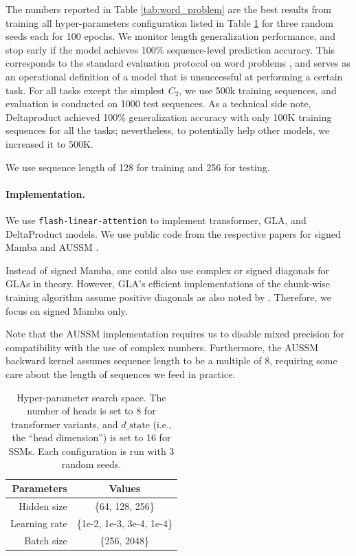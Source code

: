 The numbers reported in Table \ref{tab:word_problem} are the best results from
training all hyper-parameters configuration listed in Table \ref{tab:hyperparameters}
for three random seeds each for 100 epochs.
We monitor length generalization performance, and stop early
if the model achieves 100\% sequence-level prediction accuracy.
This corresponds to the standard evaluation protocol on word problems \citep{merrill2024illusion,siems2025deltaproduct}, and serves as an operational definition of a model that is unsuccessful at performing a certain task.
For all tasks except the simplest $C_2$, we use 500k training sequences, and evaluation is conducted on 1000 test sequences. 
As a technical side note, Deltaproduct achieved 100\% generalization accuracy with only 100K training sequences for all the tasks; nevertheless, to potentially help other models, we increased it to 500K.

We use sequence length of 128 for training and 256 for testing.

\paragraph{Implementation.}
We use \texttt{flash-linear-attention} \citep{yang2024fla} to implement transformer, GLA, and DeltaProduct models.
We use public code from the respective papers for signed Mamba \citep{grazzi2024unlocking} and AUSSM \citep{karuvally2025bridging}.

Instead of signed Mamba, one could also use complex or signed diagonals for GLAs in theory.
However, GLA's efficient implementations of the chunk-wise training algorithm assume positive diagonals as also noted by \citet{grazzi2024unlocking}.
Therefore, we focus on signed Mamba only.

Note that the AUSSM implementation requires us to disable mixed precision for compatibility with the use of complex numbers.
Furthermore, the AUSSM backward kernel assumes sequence length to be a multiple of 8,
requiring some care about the length of sequences we feed in practice.

\begin{table}[t]
\caption{
Hyper-parameter search space. The number of heads is set to 8 for transformer variants, and $d\_\text{state}$ (i.e., the ``head dimension'') is set to 16 for SSMs. Each configuration is run with 3 random seeds.
}
\label{tab:hyperparameters}
\begin{center}
\begin{tabular}{rc}
\toprule
Parameters & Values  \\ \midrule
Hidden size & \{64, 128, 256\} \\
Learning rate & \{1e-2, 1e-3, 3e-4, 1e-4\} \\
Batch size & \{256, 2048\} \\
\bottomrule
\end{tabular}
\end{center}
\end{table}

